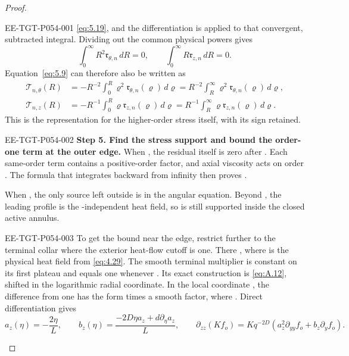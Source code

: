 \begin{proof}
%
\begin{EESegment}{EE-TGT-P054-001}
\eqref{eq:5.19}, and the differentiation is applied to that convergent, subtracted integral. Dividing out the common
physical powers gives
\[
\int_0^\infty R^2\mathfrak r_{\theta,n}\,dR=0,
\qquad
\int_0^\infty R\mathfrak r_{z,n}\,dR=0.
\]
Equation~\eqref{eq:5.9} can therefore also be written as
\[
\begin{aligned}
\mathcal T_{n,\theta}(R)
&=-R^{-2}\int_0^R\varrho^2\mathfrak r_{\theta,n}(\varrho)\,d\varrho
 =R^{-2}\int_R^\infty\varrho^2\mathfrak r_{\theta,n}(\varrho)\,d\varrho,\\
\mathcal T_{n,z}(R)
&=-R^{-1}\int_0^R\varrho\mathfrak r_{z,n}(\varrho)\,d\varrho
 =R^{-1}\int_R^\infty\varrho\mathfrak r_{z,n}(\varrho)\,d\varrho.
\end{aligned}
\]
This is the representation for the higher-order stress itself, with its sign retained.
\end{EESegment}

\begin{EESegment}{EE-TGT-P054-002}
\textbf{Step 5. Find the stress support and bound the order-one term at the outer edge.}
When , the residual itself is zero after . Each same-order term
contains a positive-order factor, and axial viscosity acts on order . The formula that
integrates backward from infinity then proves .

When , the only source left outside is
 in the angular equation. Beyond , the leading
profile is the -independent heat field, so  is still supported
inside the closed active annulus.
\end{EESegment}

\begin{EESegment}{EE-TGT-P054-003}
To get the bound near the edge, restrict further to the terminal collar where the exterior heat-flow cutoff is one.
There , where
 is the physical heat field from \eqref{eq:4.29}.
The smooth terminal multiplier  is constant on its first plateau and equals one whenever
. Its exact construction is \eqref{eq:A.12}, shifted in the logarithmic radial coordinate.
In the local coordinate , the difference from one has the form
 times a smooth factor, where
. Direct differentiation gives
\[
a_z(\eta)=-\frac{2\eta}{L},
\qquad
b_z(\eta)=\frac{-2D\eta a_z+d\partial_\eta a_z}{L},
\qquad
\partial_{zz}(Kf_o)=Kq^{-2D}\left(a_z^2\partial_{yy}f_o+b_z\partial_yf_o\right).
\]
\end{EESegment}


\end{proof}
